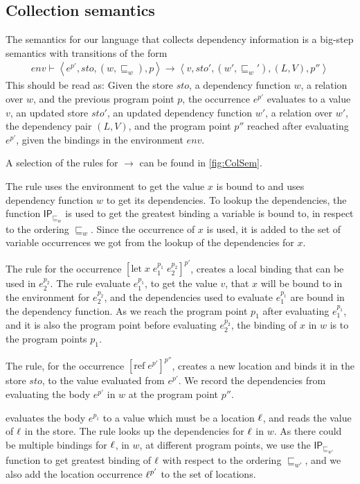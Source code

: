 \documentclass{llncs}
\newcommand{\sqleq}{\ensuremath{\sqsubseteq\xspace}}
\newcommand{\refc}{\ensuremath{\textrm{ref}\xspace}}
\newcommand{\IP}{\ensuremath{\textsf{IP}}\xspace}
\begin{document}
\subsection{Collection semantics}\label{sec:sem}

The semantics for our language that collects dependency information is
a big-step semantics with transitions of the form
%
\begin{align*}
env\vdash\left\langle e^{p'},sto,(w,\sqleq_w),p\right\rangle\rightarrow\left\langle v,sto',(w',\sqleq_w'),(L,V),p''\right\rangle
\end{align*}
%
This should be read as: Given the store $sto$, a dependency function
$w$, a relation over $w$, and the previous program point $p$, the
occurrence $e^{p'}$ evaluates to a value $v$, an updated store $sto'$,
an updated dependency function $w'$, a relation over $w'$, the
dependency pair $(L,V)$, and the program point $p''$ reached after
evaluating $e^{p'}$, given the bindings in the environment $env$. 

A selection of the rules for $\rightarrow$ can be found in
\cref{fig:ColSem}.

The  rule  uses the environment to get the value $x$ is bound to and uses dependency function $w$ to get its dependencies.
		To lookup the dependencies, the function $\IP_{\sqleq_w}$ is used to get the greatest binding a variable is bound to, in respect to the ordering $\sqleq_w$.
		Since the occurrence of $x$ is used, it is added to the set of variable occurrences we got from the lookup of the dependencies for $x$.

The  rule for the occurrence $[\mbox{let}\;x\;e_1^{p_1}\;e_2^{p_2}]^{p'}$, creates a local binding that can be used in $e_2^{p_2}$.
		The  rule evaluate $e_1^{p_1}$, to get the value $v$, that $x$ will be bound to in the environment for $e_2^{p_2}$, and the dependencies used to evaluate $e_1^{p_1}$ are bound in the dependency function.
		As we reach the program point $p_1$ after evaluating $e_1^{p_1}$, and it is also the program point before evaluating $e_2^{p_2}$, the binding of $x$ in $w$ is to the program points $p_1$.	

The  rule, for the occurrence $[\refc\;e^{p'}]^{p''}$,
creates a new location and binds it in the store $sto$, to the value
evaluated from $e^{p'}$. We record the dependencies from evaluating
the body $e^{p'}$ in $w$ at the program point $p''$.

 evaluates the body $e^{p_1}$ to a value which
must be a location $\ell$, and reads the value of $\ell$ in the store.
		The  rule looks up the dependencies for
                $\ell$ in $w$.
		As there could be multiple bindings for $\ell$, in $w$, at different program points, we use the $\IP_{\sqleq_{w'}}$ function to get greatest binding of $\ell$ with respect to the ordering $\sqleq_{w'}$, 
		and we also add the location occurrence $\ell^{p'}$ to the set of locations.
\end{document}
